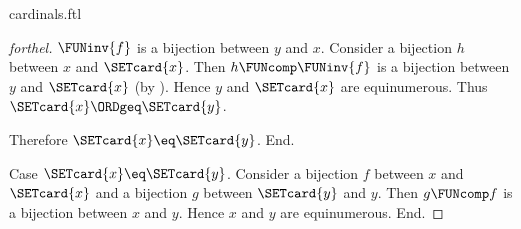 \documentclass{naproche-library}
\begin{document}
\begin{smodule}[title=Cardinal Numbers]{cardinals.ftl}
\begin{proof}[forthel]
    $\FUNinv{f}$ is a bijection between $y$ and $x$.
    Consider a bijection $h$ between $x$ and $\SETcard{x}$.
    Then $h \FUNcomp \FUNinv{f}$ is a bijection between $y$ and $\SETcard{x}$ (by ).
    Hence $y$ and $\SETcard{x}$ are equinumerous.
    Thus $\SETcard{x} \ORDgeq \SETcard{y}$.

    Therefore $\SETcard{x} \eq \SETcard{y}$.
  End.

  Case $\SETcard{x} \eq \SETcard{y}$.
    Consider a bijection $f$ between $x$ and $\SETcard{x}$ and a bijection $g$
    between $\SETcard{y}$ and $y$.
    Then $g \FUNcomp f$ is a bijection between $x$ and $y$.
    Hence $x$ and $y$ are equinumerous.
  End.
\end{proof}
\end{smodule}
\end{document}
